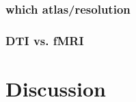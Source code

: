 \documentclass{article}
\begin{document}
\subsubsection{which atlas/resolution}


\subsubsection{DTI vs. fMRI}










\section{Discussion}






% 
% 
% 
% 
% 
% 
% 
% 



\appendix






\newpage
\small{


}
\end{document}

